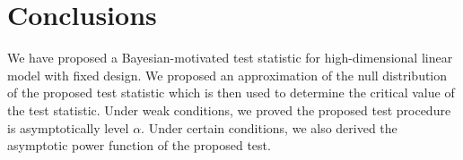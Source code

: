 \documentclass[bj]{imsart}
\newcommand{\bfsym}[1]{\ensuremath{\boldsymbol{#1}}}
\def\bbeta{\bfsym \beta}
\theoremstyle{plain}
\theoremstyle{definition}
\theoremstyle{remark}
\begin{document}
%
%









\section{Conclusions}\label{sec:conclusions}
We have proposed a Bayesian-motivated test statistic for high-dimensional linear model with fixed design.
We proposed an approximation of the null distribution of the proposed test statistic which is then used to determine the critical value of the test statistic.
Under weak conditions, we proved the proposed test procedure is asymptotically level $\alpha$.
Under certain conditions, we also derived the asymptotic power function of the proposed test.
\end{document}
